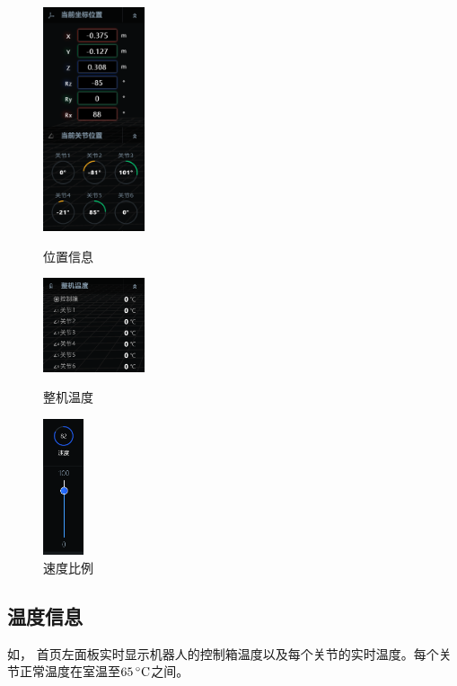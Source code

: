 \begin{figure}[htb]
	\centering
	\begin{minipage}[t]{0.3\linewidth}
		\centering
		\includegraphics[width=3cm]{image/07/图2.11 位置信息.png}
		\caption{位置信息}
		\label{fig:位置信息}
	\end{minipage}
	\hfill
	\begin{minipage}[t]{0.3\linewidth}
		\centering
			\includegraphics[width=3cm]{image/07/图2.12 整机温度.png}
			\caption{整机温度}
			\label{fig:整机温度}
	\end{minipage}
	\hfill
	\begin{minipage}[t]{0.3\linewidth}
		\centering
		\includegraphics[height=4cm]{screen/2-13.png}
		\caption{速度比例}
		\label{fig:速度比例}
	\end{minipage}
\end{figure}

\subsection{温度信息}
如，
\LM 首页左面板实时显示机器人的控制箱温度以及每个关节的实时温度。每个关节正常温度在室温至$65\,\mathrm{^\circ C}$之间。

